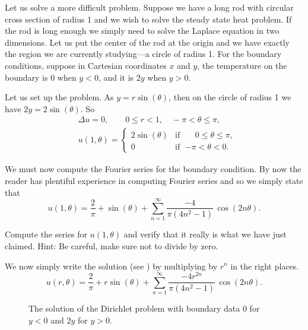 \documentclass[12pt]{book}
\begin{document}
\begin{example}
Let us solve a more difficult problem.  Suppose we have a long
rod with circular cross section of radius 1 and we wish to solve the
steady state heat problem.  If the rod is long enough we simply need to solve
the Laplace equation in two dimensions.  Let us put the center of the rod at
the origin and we have exactly the region we are currently
studying---a circle of radius 1.  For the boundary conditions, suppose in
Cartesian coordinates $x$ and
$y$, the temperature on the boundary is 0 when $y < 0$, and it is $2y$ when $y > 0$.

Let us set up the problem.  As $y = r\sin(\theta)$, then on the
circle of radius 1 we have $2y = 2\sin(\theta)$.  So
\begin{align*}
& \Delta u = 0 , \qquad 0 \leq r < 1, \quad -\pi < \theta \leq \pi,\\
& u(1,\theta) = 
\begin{cases}
2\sin(\theta) & \text{if } \; \phantom{-}0 \leq \theta \leq \pi, \\
0 & \text{if } \; {-\pi} < \theta < 0.
\end{cases}
\end{align*}

We must now compute the Fourier series for the boundary
condition.  By now the reader has plentiful experience in computing
Fourier series and so we simply state that 
\begin{equation*}
u(1,\theta) = 
\frac{2}{\pi}
+
\sin(\theta)
+
\sum_{n=1}^\infty \frac{-4}{\pi(4n^2-1)}\, \cos(2n\theta) .
\end{equation*}

\begin{exercise}
Compute the series for $u(1,\theta)$ and verify that it really is what
we have just claimed.  Hint: Be careful, make sure not to divide by zero.
\end{exercise}

We now simply write the solution (see ) by multiplying by $r^n$ in the right places.
\begin{equation*}
u(r,\theta) = 
\frac{2}{\pi}
+
r\sin(\theta)
+
\sum_{n=1}^\infty \frac{-4r^{2n}}{\pi(4n^2-1)}\, \cos(2n\theta) .
\end{equation*}
\begin{figure}[h!t]
\capstart
\begin{center}
\caption{The solution of the Dirichlet problem with
boundary data 0 for $y < 0$ and $2y$ for $y > 0$.\label{dirichdisc:zero2yfig}}
\end{center}
\end{figure}
\end{example}
\end{document}
